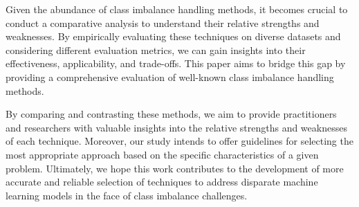 \documentclass[journal]{IEEEtran}
\begin{document}
	Given the abundance of class imbalance handling methods, it becomes crucial to conduct a comparative analysis to understand their relative strengths and weaknesses. 
	By empirically evaluating these techniques on diverse datasets and considering different evaluation metrics, we can gain insights into their effectiveness, applicability, and trade-offs. This paper aims to bridge this gap by providing a comprehensive evaluation of 
	well-known class imbalance handling methods.
	
	By comparing and contrasting these methods, we aim to provide practitioners and researchers with valuable insights into the relative strengths and weaknesses of each technique. Moreover, our study intends to offer guidelines for selecting the most appropriate approach based on the specific characteristics of a given problem. Ultimately, we hope this work contributes to the development of more accurate and reliable selection of techniques to address disparate machine learning models in the face of class imbalance challenges.
	
	\begin{comment}
		The contributions of this study include:
		\begin{itemize}
			\item An in-depth review of existing class imbalance handling techniques, categorizing them into data-level, algorithm-level, and hybrid methods.
			\item A comparative analysis of these methods using benchmark datasets from various domains.
			\item Evaluation of the methods based on performance metrics such as accuracy, precision, recall, F1-score, and area under the receiver operating characteristic curve (AUC-ROC).
			\item Insights into the strengths, limitations, and applicability of different class imbalance handling techniques.
			\item Recommendations for selecting the most suitable method(s) based on the characteristics of the dataset and the requirements of the application domain.
		\end{itemize}
	\end{comment}
	
\end{document}

